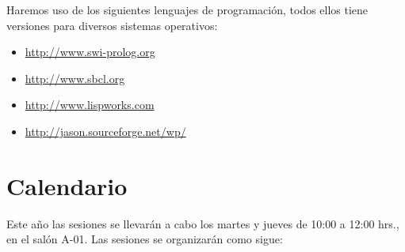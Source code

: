 \documentclass[10pt]{article}
\begin{document}
Haremos uso de los siguientes lenguajes de programación, todos ellos
tiene versiones para diversos sistemas operativos:

\begin{itemize}
\item \url{http://www.swi-prolog.org}
\item \url{http://www.sbcl.org}
\item \url{http://www.lispworks.com}
\item \url{http://jason.sourceforge.net/wp/}
\end{itemize}

\section{Calendario}

Este año las sesiones se llevarán a cabo los martes y jueves de 10:00
a 12:00 hrs., en el salón A-01. Las sesiones se organizarán como
sigue:
\end{document}
